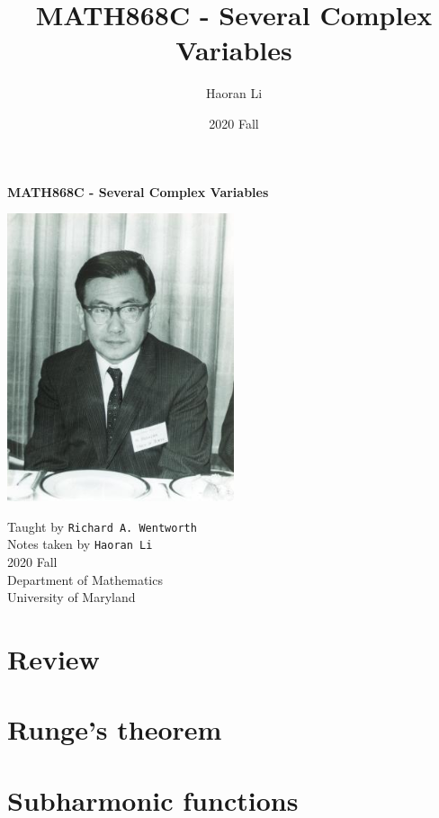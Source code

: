 \documentclass[a4paper,10pt]{article}
\title{MATH868C - Several Complex Variables}
\author{Haoran Li}
\date{2020 Fall}
\begin{document}
\sloppy %

\begin{titlepage}
\begin{center}
\vspace*{1cm}
\LARGE
\textbf{MATH868C - Several Complex Variables} \\
\vspace{2cm}
\begin{center}
\includegraphics[width=0.5\textwidth]{Pictures/Kodaira_Kunihiko.jpg}
\end{center}
\vspace{2cm}
\normalsize
Taught by \texttt{Richard A. Wentworth} \\
Notes taken by \texttt{Haoran Li} \\
2020 Fall \\
\vspace{2cm}
Department of Mathematics\\
University of Maryland\\
\end{center}
\end{titlepage}

\tableofcontents
\newpage

\section{Review}

\newpage

\section{Runge's theorem}

\newpage

\section{Subharmonic functions}

\newpage
\end{document}

